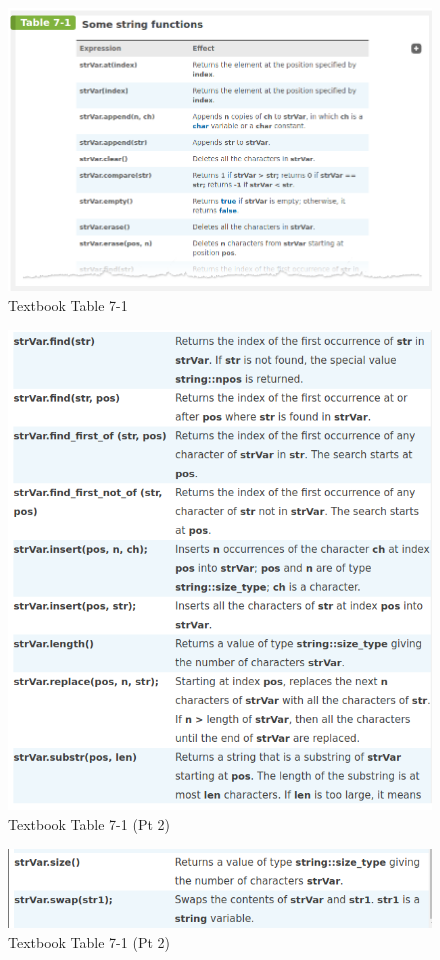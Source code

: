 \documentclass[a4paper, 11pt]{article}
\theoremstyle{definition}
\theoremstyle{plain}
\begin{document}
      \begin{figure}[H]
        \centering
        \caption{Textbook Table 7-1}
        \includegraphics[width=\textwidth]{stringfuncs.png}
      \end{figure}
      \newpage
      \begin{figure}[H]
        \centering
        \caption{Textbook Table 7-1 (Pt 2)}
        \includegraphics[width=\textwidth]{stringfuncs2.png}
      \end{figure}
      \newpage
      \begin{figure}[H]
        \centering
        \caption{Textbook Table 7-1 (Pt 2)}
        \includegraphics[width=\textwidth]{stringfuncs3.png}
      \end{figure}
\end{document}

